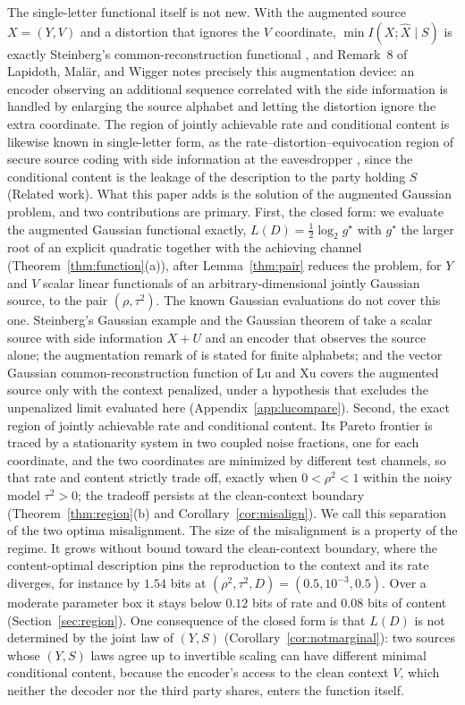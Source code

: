 \documentclass[11pt,onecolumn]{IEEEtran}
\newcommand{\hX}{\widehat{X}}
\begin{document}
The single-letter functional itself is not new. With the augmented source
$X=(Y,V)$ and a distortion that ignores the $V$ coordinate,
$\min I(X;\hX\mid S)$ is exactly Steinberg's common-reconstruction
functional \cite{steinberg2009}, and Remark~8 of Lapidoth, Mal\"ar, and
Wigger \cite{lapidoth2014} notes precisely this augmentation device: an
encoder observing an additional sequence correlated with the side
information is handled by enlarging the source alphabet and letting the
distortion ignore the extra coordinate. The region of jointly
achievable rate and conditional content is likewise known in
single-letter form, as the rate--distortion--equivocation region of
secure source coding with side information at the eavesdropper
\cite[Theorem~3]{villard2013}, since the conditional content is the
leakage of the description to the party holding $S$ (Related work).
What this paper adds is the solution of the augmented Gaussian problem,
and two contributions are primary.
First, the closed form: we evaluate the augmented Gaussian functional
exactly, $L(D)=\tfrac12\log_2 g^\star$ with $g^\star$ the larger root of
an explicit quadratic together with the achieving channel
(Theorem~\ref{thm:function}(a)), after Lemma~\ref{thm:pair} reduces the
problem, for $Y$ and $V$ scalar linear functionals of an
arbitrary-dimensional jointly Gaussian source, to the pair
$(\rho,\tau^2)$. The known Gaussian evaluations do not cover this one.
Steinberg's Gaussian example \cite{steinberg2009} and the Gaussian
theorem of \cite{lapidoth2014} take a scalar source with side
information $X+U$ and an encoder that observes the source alone; the
augmentation remark of \cite{lapidoth2014} is stated for finite
alphabets; and the vector Gaussian common-reconstruction function of Lu
and Xu \cite{luxu2021} covers the augmented source only with the context
penalized, under a hypothesis that excludes the unpenalized limit
evaluated here (Appendix~\ref{app:lucompare}). Second, the
exact region of jointly achievable rate and conditional content. Its
Pareto frontier is traced by a stationarity system in two coupled noise
fractions, one for each coordinate, and the two coordinates are minimized
by different test channels, so that rate and content strictly trade off,
exactly when $0<\rho^2<1$ within the noisy model $\tau^2>0$; the
tradeoff persists at the clean-context boundary
(Theorem~\ref{thm:region}(b) and Corollary~\ref{cor:misalign}). We call
this separation of the two optima misalignment. The size of the
misalignment is a property of the regime. It grows without bound toward
the clean-context boundary, where the content-optimal description pins
the reproduction to the context and its rate diverges, for instance by
$1.54$ bits at $(\rho^2,\tau^2,D)=(0.5,10^{-3},0.5)$. Over a moderate
parameter box it stays below $0.12$ bits of rate and $0.08$ bits of
content (Section~\ref{sec:region}). One consequence of the
closed form is that $L(D)$ is not determined by the joint law of $(Y,S)$
(Corollary~\ref{cor:notmarginal}): two sources whose $(Y,S)$ laws agree up
to invertible scaling can have different minimal conditional content,
because the encoder's access to the clean context $V$, which neither the
decoder nor the third party shares, enters the function itself.
\end{document}
